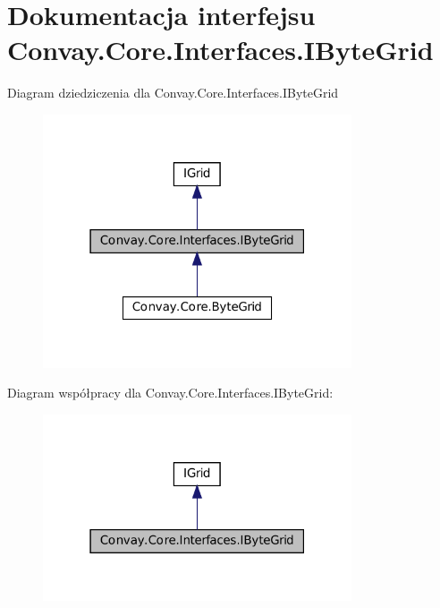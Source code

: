 \hypertarget{interface_convay_1_1_core_1_1_interfaces_1_1_i_byte_grid}{}\section{Dokumentacja interfejsu Convay.\+Core.\+Interfaces.\+I\+Byte\+Grid}
\label{interface_convay_1_1_core_1_1_interfaces_1_1_i_byte_grid}


Diagram dziedziczenia dla Convay.\+Core.\+Interfaces.\+I\+Byte\+Grid
\nopagebreak
\begin{figure}[H]
\begin{center}
\leavevmode
\includegraphics[width=259pt]{interface_convay_1_1_core_1_1_interfaces_1_1_i_byte_grid__inherit__graph}
\end{center}
\end{figure}


Diagram współpracy dla Convay.\+Core.\+Interfaces.\+I\+Byte\+Grid\+:
\nopagebreak
\begin{figure}[H]
\begin{center}
\leavevmode
\includegraphics[width=259pt]{interface_convay_1_1_core_1_1_interfaces_1_1_i_byte_grid__coll__graph}
\end{center}
\end{figure}
